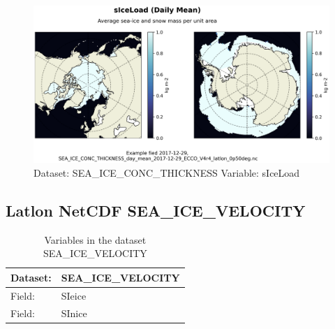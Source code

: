 \begin{figure}[H]
\centering
\includegraphics[scale=0.55]{../images/plots/latlon_plots/Sea-Ice_and_Snow_Concentration_and_Thickness/sIceLoad.png}
\caption{Dataset: SEA\_ICE\_CONC\_THICKNESS Variable: sIceLoad}
\label{tab:table-SEA_ICE_CONC_THICKNESS_sIceLoad-Plot}
\end{figure}
\pagebreak
\subsection{Latlon NetCDF SEA\_ICE\_VELOCITY}
\newp
\begin{longtable}{|p{}|p{}|}
\caption{Variables in the dataset SEA\_ICE\_VELOCITY}
\label{tab:table-SEA_ICE_VELOCITY-fields} \\ 
\hline \endhead \hline \endfoot
\rowcolor{lightgray} \textbf{Dataset:} & \textbf{SEA\_ICE\_VELOCITY} \\ \hline
Field: &SIeice \\ \hline
Field: &SInice \\ \hline
\end{longtable}

\pagebreak
